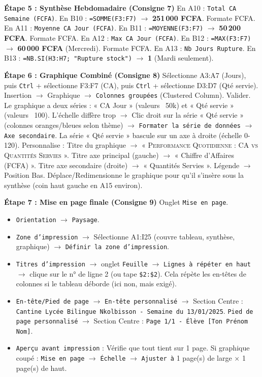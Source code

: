 \documentclass[11pt]{article}
\begin{document}
\begin{exoresolu}
\textbf{Étape 5 : Synthèse Hebdomadaire (Consigne 7)}
En A10 : \texttt{Total CA Semaine (FCFA)}. En B10 : \texttt{=SOMME(F3:F7)} $\rightarrow$ \textbf{251\,000 FCFA}. Formate FCFA.
En A11 : \texttt{Moyenne CA Jour (FCFA)}. En B11 : \texttt{=MOYENNE(F3:F7)} $\rightarrow$ \textbf{50\,200 FCFA}. Formate FCFA.
En A12 : \texttt{Max CA Jour (FCFA)}. En B12 : \texttt{=MAX(F3:F7)} $\rightarrow$ \textbf{60\,000 FCFA} (Mercredi). Formate FCFA.
En A13 : \texttt{Nb Jours Rupture}. En B13 : \texttt{=NB.SI(H3:H7; "Rupture stock")} $\rightarrow$ \textbf{1} (Mardi seulement).

\textbf{Étape 6 : Graphique Combiné (Consigne 8)}
Sélectionne A3:A7 (Jours), puis \texttt{Ctrl} + sélectionne F3:F7 (CA), puis \texttt{Ctrl} + sélectionne D3:D7 (Qté servie).
Insertion $\rightarrow$ Graphique $\rightarrow$ \texttt{Colonnes groupées} (Clustered Column). Valider.
Le graphique a deux séries : « CA Jour » (valeurs ~50k) et « Qté servie » (valeurs ~100). L'échelle diffère trop $\rightarrow$ Clic droit sur la série « Qté servie » (colonnes oranges/bleues selon thème) $\rightarrow$ \texttt{Formater la série de données} $\rightarrow$ \texttt{Axe secondaire}. La série « Qté servie » bascule sur un axe à droite (échelle 0-120).
Personnalise : Titre du graphique $\rightarrow$ « \textsc{Performance Quotidienne : CA vs Quantités Servies} ». Titre axe principal (gauche) $\rightarrow$ « Chiffre d'Affaires (FCFA) ». Titre axe secondaire (droite) $\rightarrow$ « Quantités Servies ». Légende $\rightarrow$ Position Bas. Déplace/Redimensionne le graphique pour qu'il s'insère sous la synthèse (coin haut gauche en A15 environ).

\textbf{Étape 7 : Mise en page finale (Consigne 9)}
Onglet \texttt{Mise en page}.
\begin{itemize}
    \item \texttt{Orientation} $\rightarrow$ \texttt{Paysage}.
    \item \texttt{Zone d'impression} $\rightarrow$ Sélectionne A1:I25 (couvre tableau, synthèse, graphique) $\rightarrow$ \texttt{Définir la zone d'impression}.
    \item \texttt{Titres d'impression} $\rightarrow$ onglet \texttt{Feuille} $\rightarrow$ \texttt{Lignes à répéter en haut} $\rightarrow$ clique sur le n° de ligne 2 (ou tape \texttt{\$2:\$2}). Cela répète les en-têtes de colonnes si le tableau déborde (ici non, mais exigé).
    \item \texttt{En-tête/Pied de page} $\rightarrow$ \texttt{En-tête personnalisé} $\rightarrow$ Section Centre : \texttt{Cantine Lycée Bilingue Nkolbisson - Semaine du 13/01/2025}. \texttt{Pied de page personnalisé} $\rightarrow$ Section Centre : \texttt{Page 1/1 - Élève [Ton Prénom Nom]}.
    \item \texttt{Aperçu avant impression} : Vérifie que tout tient sur 1 page. Si graphique coupé : \texttt{Mise en page} $\rightarrow$ \texttt{Échelle} $\rightarrow$ \texttt{Ajuster à} 1 page(s) de large $\times$ 1 page(s) de haut.
\end{itemize}


\end{exoresolu}
\end{document}
